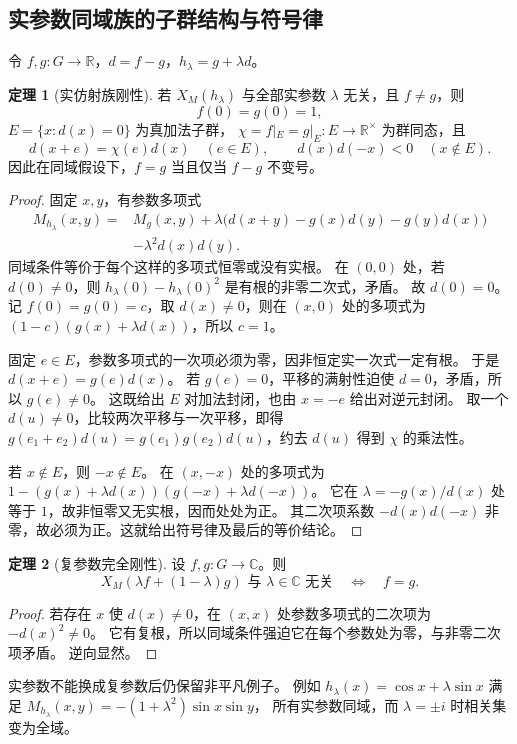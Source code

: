 \documentclass[UTF8,11pt,a4paper]{ctexart}
\theoremstyle{definition}
\newtheorem{theorem}{定理}[section]
\newcommand{\R}{\mathbb R}
\newcommand{\C}{\mathbb C}
\begin{document}
\subsection{实参数同域族的子群结构与符号律}
令 $f,g:G\to\R$，$d=f-g$，$h_\lambda=g+\lambda d$。
\begin{theorem}[实仿射族刚性]\label{thm:realrigidity}
若 $X_M(h_\lambda)$ 与全部实参数 $\lambda$ 无关，且 $f\ne g$，则
\[
 f(0)=g(0)=1,
\]
$E=\{x:d(x)=0\}$ 为真加法子群，
$\chi=f|_E=g|_E:E\to\R^\times$ 为群同态，且
\[
 d(x+e)=\chi(e)d(x)\quad(e\in E),\qquad
 d(x)d(-x)<0\quad(x\notin E).
\]
因此在同域假设下，$f=g$ 当且仅当 $f-g$ 不变号。
\end{theorem}
\begin{proof}
固定 $x,y$，有参数多项式
\begin{align*}
 M_{h_\lambda}(x,y)={}&M_g(x,y)
 +\lambda\bigl(d(x+y)-g(x)d(y)-g(y)d(x)\bigr)\\
 &-\lambda^2d(x)d(y).
\end{align*}
同域条件等价于每个这样的多项式恒零或没有实根。
在 $(0,0)$ 处，若 $d(0)\ne0$，则 $h_\lambda(0)-h_\lambda(0)^2$ 是有根的非零二次式，矛盾。
故 $d(0)=0$。记 $f(0)=g(0)=c$，取 $d(x)\ne0$，则在 $(x,0)$ 处的多项式为
$(1-c)(g(x)+\lambda d(x))$，所以 $c=1$。

固定 $e\in E$，参数多项式的一次项必须为零，因非恒定实一次式一定有根。
于是 $d(x+e)=g(e)d(x)$。
若 $g(e)=0$，平移的满射性迫使 $d=0$，矛盾，所以 $g(e)\ne0$。
这既给出 $E$ 对加法封闭，也由 $x=-e$ 给出对逆元封闭。
取一个 $d(u)\ne0$，比较两次平移与一次平移，即得
$g(e_1+e_2)d(u)=g(e_1)g(e_2)d(u)$，约去 $d(u)$ 得到 $\chi$ 的乘法性。

若 $x\notin E$，则 $-x\notin E$。
在 $(x,-x)$ 处的多项式为
$1-(g(x)+\lambda d(x))(g(-x)+\lambda d(-x))$。
它在 $\lambda=-g(x)/d(x)$ 处等于 $1$，故非恒零又无实根，因而处处为正。
其二次项系数 $-d(x)d(-x)$ 非零，故必须为正。这就给出符号律及最后的等价结论。
\end{proof}

\begin{theorem}[复参数完全刚性]
设 $f,g:G\to\C$。则
\[
 X_M(\lambda f+(1-\lambda)g)\text{ 与 }\lambda\in\C\text{ 无关}
 \quad\Longleftrightarrow\quad f=g.
\]
\end{theorem}
\begin{proof}
若存在 $x$ 使 $d(x)\ne0$，在 $(x,x)$ 处参数多项式的二次项为 $-d(x)^2\ne0$。
它有复根，所以同域条件强迫它在每个参数处为零，与非零二次项矛盾。
逆向显然。
\end{proof}
实参数不能换成复参数后仍保留非平凡例子。
例如 $h_\lambda(x)=\cos x+\lambda\sin x$ 满足
$M_{h_\lambda}(x,y)=-(1+\lambda^2)\sin x\sin y$，
所有实参数同域，而 $\lambda=\pm i$ 时相关集变为全域。
\end{document}
